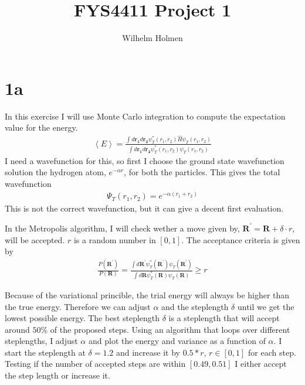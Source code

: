 \documentclass[a4paper, 12pt, titlepage]{article}
\author{Wilhelm Holmen}
\title{FYS4411 Project 1}
\begin{document}
 \maketitle
 \newpage

 \section*{1a}
 In this exercise I will use Monte Carlo integration to compute the expectation value for the energy. 
 \begin{align*}
 	\left< E \right> = \frac{\int d \mathbf{r_1} d \mathbf{r_2} \psi_T^*(r_1,r_2) \hat H \psi_T(r_1,r_2)}{\int d \mathbf{r_1} d \mathbf{r_2} \psi_T^*(r_1,r_2) \psi_T(r_1,r_2)}
 \end{align*}
 I need a wavefunction for this, so first I choose the ground state wavefunction solution the hydrogen atom, $e^{-\alpha r}$, for both the particles. This gives the total wavefunction
 \begin{align*}
 	\Psi_T(r_1,r_2) = e^{-\alpha(r_1 + r_2)}
 \end{align*}
 This is not the correct wavefunction, but it can give a decent first evaluation. 

 In the Metropolis algorithm, I will check wether a move given by, $\mathbf{R^{'}} = \mathbf{R} + \delta \cdot r $, will be accepted. $r$ is a random number in $[0,1]$. The acceptance criteria is given by
 \begin{align*}
 	\frac{P(\mathbf{R^{'}} )}{P(\mathbf{R} )} = \frac{\int d \mathbf{R^{'}} \psi^*_T(\mathbf{R^{'}} ) \psi_T(\mathbf{R^{'}} )}{\int d \mathbf{R} \psi^*_T(\mathbf{R}) \psi_T(\mathbf{R} )} \geq r
 \end{align*}

 Because of the variational princible, the trial energy will always be higher than the true energy. Therefore we can adjust $\alpha$ and the steplength $\delta$ until we get the lowest possible energy. The best steplength $\delta$ is a steplength that will accept around $50\%$ of the proposed steps. Using an algorithm that loops over different steplengths, I adjust $\alpha$ and plot the energy and variance as a function of $\alpha$. I start the steplength at $\delta = 1.2$ and increase it by $0.5*r$, $r \in [0,1]$ for each step. Testing if the number of accepted steps are within $[0.49,0.51]$ I either accept the step length or increase it.  
\end{document}
